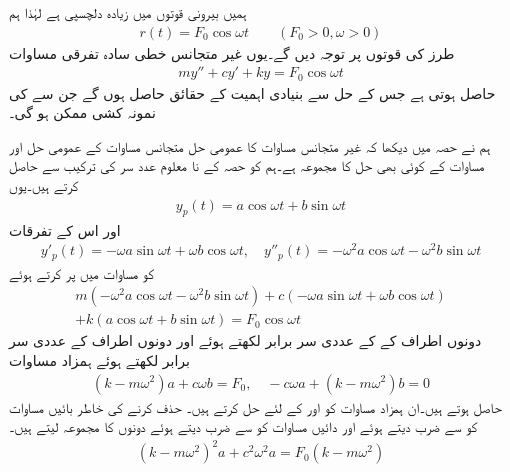 ہمیں  بیرونی قوتوں میں زیادہ دلچسپی ہے لہٰذا ہم
\begin{align*}
r(t)=F_0\cos \omega t\quad\quad (F_0 >0, \omega>0)
\end{align*}
طرز کی قوتوں پر توجہ دیں گے۔یوں غیر متجانس خطی سادہ تفرقی مساوات 
 \begin{align}\label{مساوات_سادہ_دو_غیر_متجانس_نظام_پ}
my''+cy'+ky=F_0 \cos \omega t
\end{align} 
حاصل ہوتی ہے جس کے حل سے بنیادی اہمیت کے حقائق حاصل ہوں گے  جن سے  کی نمونہ کشی ممکن ہو گی۔

ہم نے حصہ  میں دیکھا کہ غیر متجانس مساوات  کا عمومی حل  متجانس مساوات  کے عمومی حل  اور مساوات  کے کوئی بھی حل  کا مجموعہ ہے۔ہم  کو حصہ  کے نا معلوم عدد سر کی ترکیب سے حاصل کرتے ہیں۔یوں
\begin{align}\label{مساوات_سادہ_دو_جبری_تفاعل_حل}
y_p(t)=a \cos \omega t +b \sin \omega t
\end{align}
اور اس کے تفرقات
\begin{align*}
y'_p(t)=-\omega a \sin \omega t+\omega b \cos \omega t, \quad y''_p(t)=-\omega^2a\cos \omega t-\omega^2 b\sin \omega t
\end{align*}
کو مساوات  میں پر کرتے ہوئے
 \begin{multline*}
m(-\omega^2a\cos \omega t-\omega^2 b\sin \omega t)+c(-\omega a \sin \omega t+\omega b \cos \omega t)\\
+k(a \cos \omega t+b \sin \omega t)=F_0 \cos \omega t
\end{multline*} 
 دونوں اطراف کے  کے عددی سر برابر لکھتے ہوئے اور دونوں اطراف  کے عددی سر برابر لکھتے ہوئے ہمزاد مساوات
\begin{align*}
(k-m\omega^2)a+c\omega b=F_0,\quad -c\omega a+(k-m\omega^2)b=0 
\end{align*}
حاصل ہوتے ہیں۔ان ہمزاد مساوات کو  اور  کے لئے حل کرتے ہیں۔ حذف کرنے کی خاطر بائیں مساوات کو  سے ضرب دیتے ہوئے اور دائیں مساوات کو  سے ضرب دیتے ہوئے دونوں کا مجموعہ لیتے ہیں۔
\begin{align*}
(k-m\omega^2)^2a+c^2\omega^2a=F_0(k-m\omega^2)
\end{align*}
